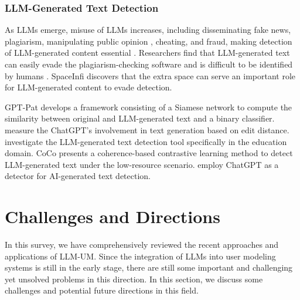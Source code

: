 \documentclass[11pt]{article}
\begin{document}

\subsubsection{LLM-Generated Text Detection}
\label{sec:sus_LLMgen}
As LLMs emerge, misuse of LLMs increases, including disseminating fake news, plagiarism, manipulating public opinion \citet{hanley2023machine}, cheating, and fraud, making detection of LLM-generated content essential \cite{pegoraro2023chatgpt, dhaini2023detecting, tang2023science, chen2023can, lu2023large}.
Researchers find that LLM-generated text can easily evade the plagiarism-checking software \citet{khalil2023will} and is difficult to be identified by humans \cite{wahle2022large}. SpaceInfi \cite{cai2023evade} discovers that the extra space can serve an important role for LLM-generated content to evade detection.

GPT-Pat \cite{yu2023gpt} develops a framework consisting of a Siamese network to compute the similarity between original and LLM-generated text and a binary classifier. \citet{yang2023chatgpt} measure the ChatGPT's involvement in text generation based on edit distance. \citet{orenstrakh2023detecting} investigate the LLM-generated text detection tool specifically in the education domain. CoCo \cite{liu2022coco} presents a coherence-based contrastive learning method to detect LLM-generated text under the low-resource scenario. \citet{bhattacharjee2023fighting} employ ChatGPT as a detector for AI-generated text detection. 


\section{Challenges and Directions}
\label{sec:future}
In this survey, we have comprehensively reviewed the recent approaches and applications of LLM-UM. Since the integration of LLMs into user modeling systems is still in the early stage, there are still some important and challenging yet unsolved problems in this direction. In this section, we discuss some challenges and potential future directions in this field.
\end{document}
